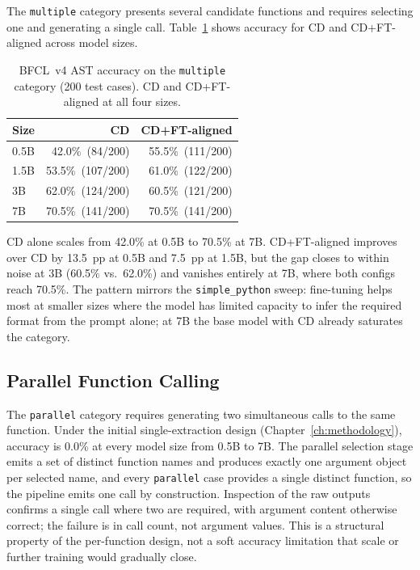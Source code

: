 The \texttt{multiple} category presents several candidate functions and
requires selecting one and generating a single call. Table~\ref{tab:bfcl-multiple}
shows accuracy for CD and CD+FT-aligned across model sizes.

\begin{table}[ht]
\centering
\caption{BFCL~v4 AST accuracy on the \texttt{multiple} category (200 test
cases). CD and CD+FT-aligned at all four sizes.}
\label{tab:bfcl-multiple}
\begin{tabular}{lrr}
\toprule
Size & CD & CD+FT-aligned \\
\midrule
0.5B & 42.0\%\ (84/200)  & 55.5\%\ (111/200) \\
1.5B & 53.5\%\ (107/200) & 61.0\%\ (122/200) \\
3B   & 62.0\%\ (124/200) & 60.5\%\ (121/200) \\
7B   & 70.5\%\ (141/200) & 70.5\%\ (141/200) \\
\bottomrule
\end{tabular}
\end{table}

CD alone scales from 42.0\% at 0.5B to 70.5\% at 7B. CD+FT-aligned improves
over CD by 13.5~pp at 0.5B and 7.5~pp at 1.5B, but the gap closes to within
noise at 3B (60.5\% vs.\ 62.0\%) and vanishes entirely at 7B, where both
configs reach 70.5\%. The pattern mirrors the \texttt{simple\_python} sweep: fine-tuning
helps most at smaller sizes where the model has limited capacity to infer the
required format from the prompt alone; at 7B the base model with CD already
saturates the category.

\subsection{Parallel Function Calling}

The \texttt{parallel} category requires generating two simultaneous calls
to the same function. Under the initial single-extraction design
(Chapter~\ref{ch:methodology}), accuracy is 0.0\% at every model size from
0.5B to 7B. The parallel selection stage emits a set of distinct function
names and produces exactly one argument object per selected name, and every
\texttt{parallel} case provides a single distinct function, so the pipeline
emits one call by construction. Inspection of the raw outputs confirms a
single call where two are required, with argument content otherwise correct;
the failure is in call count, not argument values. This is a structural
property of the per-function design, not a soft accuracy limitation that
scale or further training would gradually close.


